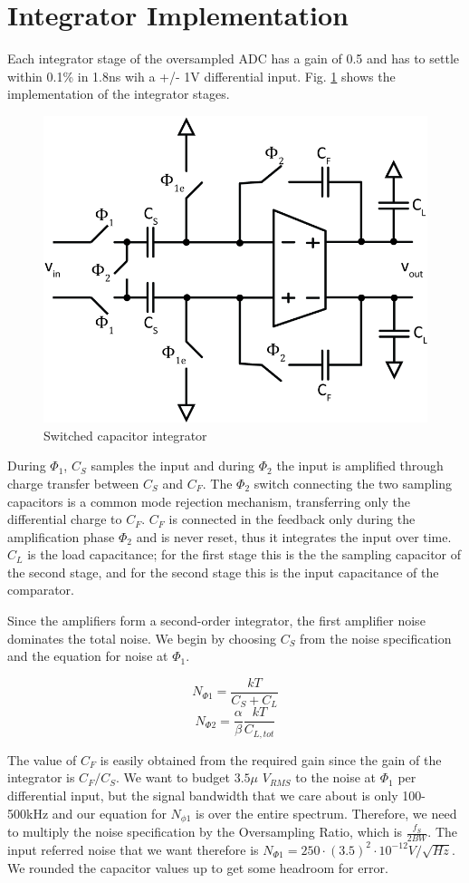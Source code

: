 \documentclass[conference]{IEEEtran}
\begin{document}
\section{Integrator Implementation}

Each integrator stage of the oversampled ADC has a gain of 0.5 and has to settle within 0.1\% in 1.8ns wih a +/- 1V differential input. Fig. \ref{fig:int} shows the implementation of the integrator stages.

\begin{figure}[h]
\centering
\includegraphics[width=0.7\linewidth]{illus/integrator}
\caption{Switched capacitor integrator}
\label{fig:int}
\end{figure}

During $\Phi_1$, $C_S$ samples the input and during $\Phi_2$ the input is amplified through charge transfer between $C_S$ and $C_F$. The $\Phi_2$ switch connecting the two sampling capacitors is a common mode rejection mechanism, transferring only the differential charge to $C_F$. $C_F$ is connected in the feedback only during the amplification phase $\Phi_2$ and is never reset, thus it integrates the input over time. $C_L$ is the load capacitance; for the first stage this is the the sampling capacitor of the second stage, and for the second stage this is the input capacitance of the comparator.

Since the amplifiers form a second-order integrator, the first amplifier noise dominates the total noise. We begin by choosing $C_S$ from the noise specification and the equation for noise at $\Phi_1$. 

$$N_{\Phi 1} = \frac{kT}{C_S + C_L}$$
$$N_{\Phi 2} = \frac{\alpha}{\beta}\frac{kT}{C_{L,tot}}$$

The value of $C_F$ is easily obtained from the required gain since the gain of the integrator is $C_F/C_S$. We want to budget $3.5 \mu$ $V_{RMS}$ to the noise at $\Phi_1$ per differential input, but the signal bandwidth that we care about is only 100-500kHz and our equation for $N_{\phi 1}$ is over the entire spectrum. Therefore, we need to multiply the noise specification by the Oversampling Ratio, which is $\frac{f_S}{2BW}$. The input referred noise that we want therefore is $N_{\Phi 1}=250 \cdot (3.5)^2 \cdot 10^{-12} V/\sqrt{Hz}$. We rounded the capacitor values up to get some headroom for error.
\end{document}
